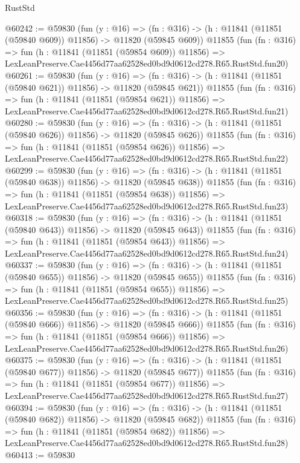 \begin{lexlean}{RustStd}
\begin{coremodule}
@60242 := @59830
    (fun (y : @16) =>
    (fn : @316) -> (h : @11841 (@11851 (@59840 @609)) @11856) -> @11820 (@59845 @609))
    @11855
    (fun (fn : @316) =>
    fun (h : @11841 (@11851 (@59854 @609)) @11856) =>
    LexLeanPreserve.Cae4456d77aa62528ed0bd9d0612cd278.R65.RustStd.fun20)
@60261 := @59830
    (fun (y : @16) =>
    (fn : @316) -> (h : @11841 (@11851 (@59840 @621)) @11856) -> @11820 (@59845 @621))
    @11855
    (fun (fn : @316) =>
    fun (h : @11841 (@11851 (@59854 @621)) @11856) =>
    LexLeanPreserve.Cae4456d77aa62528ed0bd9d0612cd278.R65.RustStd.fun21)
@60280 := @59830
    (fun (y : @16) =>
    (fn : @316) -> (h : @11841 (@11851 (@59840 @626)) @11856) -> @11820 (@59845 @626))
    @11855
    (fun (fn : @316) =>
    fun (h : @11841 (@11851 (@59854 @626)) @11856) =>
    LexLeanPreserve.Cae4456d77aa62528ed0bd9d0612cd278.R65.RustStd.fun22)
@60299 := @59830
    (fun (y : @16) =>
    (fn : @316) -> (h : @11841 (@11851 (@59840 @638)) @11856) -> @11820 (@59845 @638))
    @11855
    (fun (fn : @316) =>
    fun (h : @11841 (@11851 (@59854 @638)) @11856) =>
    LexLeanPreserve.Cae4456d77aa62528ed0bd9d0612cd278.R65.RustStd.fun23)
@60318 := @59830
    (fun (y : @16) =>
    (fn : @316) -> (h : @11841 (@11851 (@59840 @643)) @11856) -> @11820 (@59845 @643))
    @11855
    (fun (fn : @316) =>
    fun (h : @11841 (@11851 (@59854 @643)) @11856) =>
    LexLeanPreserve.Cae4456d77aa62528ed0bd9d0612cd278.R65.RustStd.fun24)
@60337 := @59830
    (fun (y : @16) =>
    (fn : @316) -> (h : @11841 (@11851 (@59840 @655)) @11856) -> @11820 (@59845 @655))
    @11855
    (fun (fn : @316) =>
    fun (h : @11841 (@11851 (@59854 @655)) @11856) =>
    LexLeanPreserve.Cae4456d77aa62528ed0bd9d0612cd278.R65.RustStd.fun25)
@60356 := @59830
    (fun (y : @16) =>
    (fn : @316) -> (h : @11841 (@11851 (@59840 @666)) @11856) -> @11820 (@59845 @666))
    @11855
    (fun (fn : @316) =>
    fun (h : @11841 (@11851 (@59854 @666)) @11856) =>
    LexLeanPreserve.Cae4456d77aa62528ed0bd9d0612cd278.R65.RustStd.fun26)
@60375 := @59830
    (fun (y : @16) =>
    (fn : @316) -> (h : @11841 (@11851 (@59840 @677)) @11856) -> @11820 (@59845 @677))
    @11855
    (fun (fn : @316) =>
    fun (h : @11841 (@11851 (@59854 @677)) @11856) =>
    LexLeanPreserve.Cae4456d77aa62528ed0bd9d0612cd278.R65.RustStd.fun27)
@60394 := @59830
    (fun (y : @16) =>
    (fn : @316) -> (h : @11841 (@11851 (@59840 @682)) @11856) -> @11820 (@59845 @682))
    @11855
    (fun (fn : @316) =>
    fun (h : @11841 (@11851 (@59854 @682)) @11856) =>
    LexLeanPreserve.Cae4456d77aa62528ed0bd9d0612cd278.R65.RustStd.fun28)
@60413 := @59830

\end{coremodule}
\end{lexlean}
